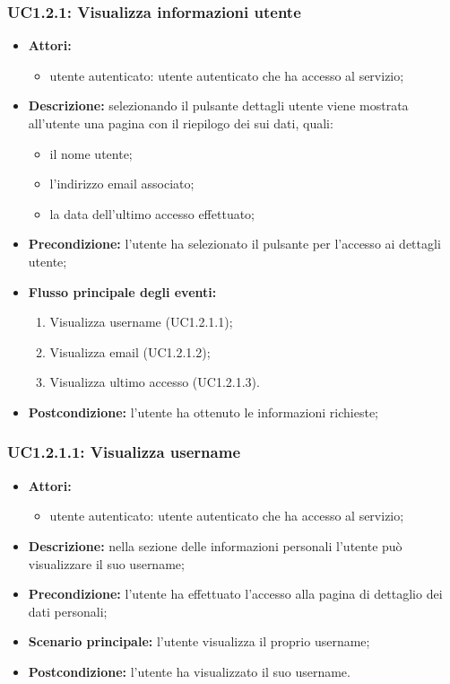 \subsubsection{UC1.2.1: Visualizza informazioni utente}
\begin{itemize}
	\item \textbf{Attori:}
	\begin{itemize}
		\item utente autenticato: utente autenticato che ha accesso al servizio;
	\end{itemize}
	\item \textbf{Descrizione:} selezionando il pulsante dettagli utente viene mostrata all'utente una pagina con il riepilogo dei sui dati, quali:
	\begin{itemize}
		\item il nome utente;
		\item l'indirizzo email associato;
		\item la data dell'ultimo accesso effettuato;
	\end{itemize}
	\item \textbf{Precondizione:} l'utente ha selezionato il pulsante per l'accesso ai dettagli utente;
	\item \textbf{Flusso principale degli eventi:}
	\begin{enumerate}
    \item Visualizza username (UC1.2.1.1);
    \item Visualizza email (UC1.2.1.2);
    \item Visualizza ultimo accesso (UC1.2.1.3).
  \end{enumerate}
	\item \textbf{Postcondizione:} l'utente ha ottenuto le informazioni richieste;
\end{itemize}

\subsubsection{UC1.2.1.1: Visualizza username}
\begin{itemize}
	\item \textbf{Attori:}
	\begin{itemize}
		\item utente autenticato: utente autenticato che ha accesso al servizio;
	\end{itemize}
	\item \textbf{Descrizione:} nella sezione delle informazioni personali l'utente può visualizzare il suo username;
	\item \textbf{Precondizione:} l'utente ha effettuato l'accesso alla pagina di dettaglio dei dati personali;
	\item \textbf{Scenario principale:} l'utente visualizza il proprio username;
	\item \textbf{Postcondizione:} l'utente ha visualizzato il suo username.
\end{itemize}

